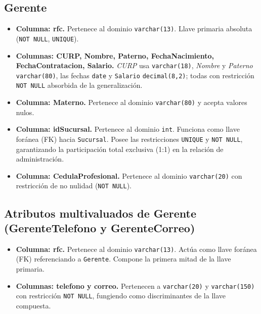 \documentclass[11pt,letterpaper,spanish]{article}
\begin{document}
\subsection*{Gerente}
\begin{itemize}
	\item \textbf{Columna: rfc.} Pertenece al dominio \texttt{varchar(13)}. Llave primaria absoluta (\texttt{NOT NULL}, \texttt{UNIQUE}).
	\item \textbf{Columnas: CURP, Nombre, Paterno, FechaNacimiento, FechaContratacion, Salario.} \textit{CURP} usa \texttt{varchar(18)}, \textit{Nombre} y \textit{Paterno} \texttt{varchar(80)}, las fechas \texttt{date} y \texttt{Salario} \texttt{decimal(8,2)}; todas con restricción \texttt{NOT NULL} absorbida de la generalización.
	\item \textbf{Columna: Materno.} Pertenece al dominio \texttt{varchar(80)} y acepta valores nulos.
	\item \textbf{Columna: idSucursal.} Pertenece al dominio \texttt{int}. Funciona como llave foránea (FK) hacia \texttt{Sucursal}. Posee las restricciones \texttt{UNIQUE} y \texttt{NOT NULL}, garantizando la participación total exclusiva (1:1) en la relación de administración.
	\item \textbf{Columna: CedulaProfesional.} Pertenece al dominio \texttt{varchar(20)} con restricción de no nulidad (\texttt{NOT NULL}).
\end{itemize}

\subsection*{Atributos multivaluados de Gerente (GerenteTelefono y GerenteCorreo)}
\begin{itemize}
	\item \textbf{Columna: rfc.} Pertenece al dominio \texttt{varchar(13)}. Actúa como llave foránea (FK) referenciando a \texttt{Gerente}. Compone la primera mitad de la llave primaria.
	\item \textbf{Columnas: telefono y correo.} Pertenecen a \texttt{varchar(20)} y \texttt{varchar(150)} con restricción \texttt{NOT NULL}, fungiendo como discriminantes de la llave compuesta.
\end{itemize}
\end{document}
